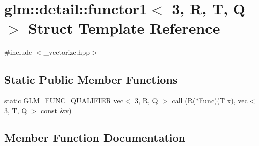 \hypertarget{structglm_1_1detail_1_1functor1_3_013_00_01_r_00_01_t_00_01_q_01_4}{}\section{glm\+:\+:detail\+:\+:functor1$<$ 3, R, T, Q $>$ Struct Template Reference}
\label{structglm_1_1detail_1_1functor1_3_013_00_01_r_00_01_t_00_01_q_01_4}


{\ttfamily \#include $<$\+\_\+vectorize.\+hpp$>$}

\subsection*{Static Public Member Functions}
\begin{DoxyCompactItemize}
\item 
static \mbox{\hyperlink{setup_8hpp_a33fdea6f91c5f834105f7415e2a64407}{G\+L\+M\+\_\+\+F\+U\+N\+C\+\_\+\+Q\+U\+A\+L\+I\+F\+I\+ER}} \mbox{\hyperlink{structglm_1_1vec}{vec}}$<$ 3, R, Q $>$ \mbox{\hyperlink{structglm_1_1detail_1_1functor1_3_013_00_01_r_00_01_t_00_01_q_01_4_a89ea8c7ead27b1a70ac9830eba529000}{call}} (R($\ast$Func)(T \mbox{\hyperlink{_s_d_l__opengl_8h_ad0e63d0edcdbd3d79554076bf309fd47}{x}}), \mbox{\hyperlink{structglm_1_1vec}{vec}}$<$ 3, T, Q $>$ const \&\mbox{\hyperlink{_s_d_l__opengl_8h_a10a82eabcb59d2fcd74acee063775f90}{v}})
\end{DoxyCompactItemize}


\subsection{Member Function Documentation}
\mbox{\label{structglm_1_1detail_1_1functor1_3_013_00_01_r_00_01_t_00_01_q_01_4_a89ea8c7ead27b1a70ac9830eba529000}} 
